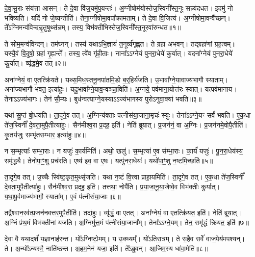 दे॒वा॒सु॒राः संय॑त्ता आसन्।
ते दे॒वा वि॑ज॒यमु॑प॒यन्तः॑।
अ॒ग्नीषोम॑योस्तेज॒स्विनी᳚स्त॒नूः सन्न्य॑दधत।
इ॒दमु॑ नो भविष्यति।
यदि॑ नो जे॒ष्यन्तीति॑।
तेना॒ग्नीषोमा॒वपा᳚क्रामताम्।
ते दे॒वा वि॒जित्य॑।
अ॒ग्नीषोमा॒वन्वै᳚च्छन्।
ते᳚ऽग्निमन्व॑\-विन्दन्नृ॒तुषूथ्स॑न्नम्।
तस्य॒ विभ॑क्तीभिस्तेज॒स्विनी᳚स्त॒नू\-रवा॑रुन्धत॥१॥\ip

ते सोम॒मन्व॑विन्दन्।
तम॑घ्नन्।
तस्य॑ यथा\-ऽभि॒ज्ञायं॑ त॒नूर्व्य॑गृह्णत।
ते ग्रहा॑ अभवन्।
तद्ग्रहा॑णां ग्रह॒त्वम्।
यस्यै॒वं वि॒दुषो॒ ग्रहा॑ गृ॒ह्यन्ते᳚।
तस्य॒ त्वे॑व गृ॑ही॒ताः।
नाना᳚\-ऽऽग्नेयं पुनरा॒धेये॑ कुर्यात्।
यदना᳚ग्नेयं पुनरा॒धेये॑ कु॒र्यात्।
व्यृ॑द्धमे॒व तत्॥२॥\ip

अना᳚ग्नेयं॒ वा ए॒तत्क्रि॑यते।
यथ्स॒मिध॒स्तनू॒नपा॑तमि॒डो ब॒र्॒\mbox{}हिर्य॑जति।
उ॒भावा᳚ग्ने॒यावाज्य॑\-भागौ स्याताम्।
अना᳚ज्यभागौ भवत॒ इत्या॑हुः।
यदु॒भावा᳚ग्ने॒याव॒न्वञ्चा॒विति॑।
अ॒ग्नये॒ पव॑माना॒योत्त॑रः स्यात्।
यत्पव॑मानाय।
तेनाऽऽज्य॑भागः।
तेन॑ सौ॒म्यः।
बुध॑न्वत्याग्ने॒यस्या\-ऽ\-ऽ\-ज्य॑भागस्य पुरो\-ऽनुवा॒क्या॑ भवति॥३॥\ip

यथा॑ सु॒प्तं बो॒धय॑ति।
ता॒दृगे॒व तत्।
अ॒ग्निन्य॑क्ताः पत्नीसंया॒जाना॒मृचः॑ स्युः।
तेना᳚ऽऽग्ने॒यꣳ सर्वं॑ भवति।
ए॒क॒धा ते॑ज॒स्विनीं᳚ दे॒वता॒मुपै॒तीत्या॑हुः।
सैन॑मीश्व॒रा प्र॒दह॒ इति॑।
नेति॑ ब्रूयात्।
प्र॒जन॑नं॒ वा अ॒ग्निः।
प्र॒जन॑नमे॒वोपै॒तीति॑।
कृ॒तय॑जुः॒ सम्भृ॑तसम्भार॒ इत्या॑हुः॥४॥\ip

न स॒म्भृत्याः᳚ सम्भा॒राः।
न यजुः॑ का॒र्य॑मिति॑।
अथो॒ खलु॑।
स॒म्भृत्या॑ ए॒व स॑म्भा॒राः।
का॒र्यं॑ यजुः॑।
पु॒न॒रा॒धेय॑स्य॒ समृ॑द्ध्यै।
तेनो॑पा॒ꣳ॒शु प्रच॑रति।
एष्य॑ इव॒ वा ए॒षः।
यत्पु॑नरा॒धेयः॑।
यथो॑पा॒ꣳ॒शु न॒ष्टमि॒च्छति॑॥५॥\ip

ता॒दृगे॒व तत्।
उ॒च्चैः स्वि॑ष्ट॒कृत॒मुथ्सृ॑जति।
यथा॑ न॒ष्टं वि॒त्त्वा प्राहा॒यमिति॑।
ता॒दृगे॒व तत्।
ए॒क॒धा ते॑ज॒स्विनीं᳚ दे॒वता॒मुपै॒तीत्या॑हुः।
सैन॑मीश्व॒रा प्र॒दह॒ इति॑।
तत्तथा॒ नोपै॑ति।
प्र॒या॒जा॒नू॒या॒जेष्वे॒व विभ॑क्तीः कुर्यात्।
य॒था॒पू॒र्वमाज्य॑\-भागौ॒ स्याता᳚म्।
ए॒वं प॑त्नीसंया॒जाः॥६॥\ip

तद्वै᳚श्वान॒रव॑त्प्र॒जन॑नवत्तर॒मुपै॒तीति॑।
तदा॑हुः।
व्यृ॑द्धं॒ वा ए॒तत्।
अना᳚ग्नेयं॒ वा ए॒तत्क्रि॑यत॒ इति॑।
नेति॑ ब्रूयात्।
अ॒ग्निं प्र॑थ॒मं विभ॑क्तीनां यजति।
अ॒ग्निमु॑त्त॒मं प॑त्नीसंया॒जाना᳚म्।
तेना᳚ऽऽग्ने॒यम्।
तेन॒ समृ॑द्धं क्रियत॒ इति॑॥७॥\ip\anuvakamend[अ॒रु॒न्ध॒तै॒व तद्भ॑वति॒ सम्भृ॑तसम्भार॒ इत्या॑हुरि॒च्छति॑ पत्नीसंया॒जा नव॑ च]

दे॒वा वै यथा॒दर्\mbox{}शं॑ य॒ज्ञानाह॑रन्त।
यो᳚ऽग्निष्टो॒मम्।
य उ॒क्थ्यम्᳚।
यो॑ऽतिरा॒त्रम्।
ते स॒हैव सर्वे॑ वाज॒पेय॑मपश्यन्।
ते।
अ॒न्यो᳚\-ऽन्यस्मै॒ नाति॑ष्ठन्त।
अ॒हम॒नेन॑ यजा॒ इति॑।
ते᳚ऽब्रुवन्।
आ॒जिम॒स्य धा॑वा॒मेति॑॥८॥\ip


